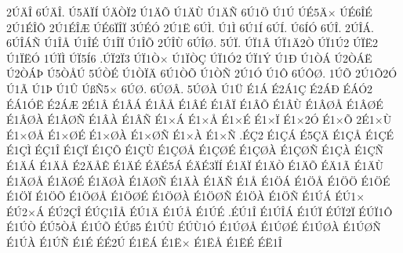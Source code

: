 {2^^da^^c4^^ce
6^^da^^c4^^ce.
^^da5^^c4^^cf^^cd
^^da^^c4^^d2^^cf2
^^da1^^c4^^d5
^^da1^^c4^^d9
^^da1^^c4^^d1
6^^da1^^d6
^^da1^^da
^^da^^c95^^c4^^d7
^^da^^c96^^ce^^c9
2^^da1^^c9^^ce^^d4
2^^da1^^c9^^ce^^c6
^^da^^c96^^cf^^ce^^cf
3^^da^^c9^^d3
2^^da1^^cb
6^^da^^cc.
^^da1^^cc
6^^da1^^cd
6^^da^^cd.
^^da6^^cd^^d3
6^^da^^ce.
2^^da^^ce^^c1.
6^^da^^ce^^c1^^d1
^^da1^^ce^^c5
^^da1^^ce^^c9
^^da1^^ce^^cf
^^da1^^ce^^d5
2^^da^^ce^^d9
6^^da^^ce^^d8.
5^^da^^cf.
^^da^^cf1^^c2
^^da^^cf1^^c42^^d2
^^da^^cf1^^da2
^^da^^cf^^cb2
^^da1^^cf^^cb^^d3
1^^da^^cf^^cc
^^da^^cf5^^cd6
.^^da^^cf2^^cf3
^^da^^cf1^^d2^^d7
^^da1^^cf^^d2^^c7
^^da^^cf1^^d32
^^da^^cf1^^dd
^^da1^^d0
^^da1^^d2^^c1
^^da2^^d2^^c1^^cb
^^da2^^d2^^c1^^de
^^da5^^d2^^c5^^da
5^^da^^d2^^c9
^^da1^^d2^^cf^^c4
6^^da1^^d2^^d5
^^da1^^d2^^d1
2^^da1^^d3
^^da1^^d4
6^^da^^d4^^d8.
1^^da^^d5
2^^da1^^d52^^d3
^^da1^^c3
^^da1^^de
^^da1^^db
^^da^^df^^d15^^d7
6^^da^^d8.
6^^da^^d8^^c2.
5^^da^^d8^^c0
^^da1^^dc
^^c91^^c1
^^c92^^c11^^c7
^^c92^^c1^^d0
^^c9^^c1^^d32
^^c9^^c11^^d3^^cb
^^c92^^c1^^c6
2^^c91^^c2
^^c91^^c2^^c1
^^c91^^c2^^c5
^^c91^^c2^^c9
^^c91^^c2^^cf
^^c91^^c2^^d5
^^c91^^c2^^d9
^^c91^^c2^^d8^^c5
^^c91^^c2^^d8^^c9
^^c91^^c2^^d8^^c0
^^c91^^c2^^d8^^d1
^^c91^^c2^^c0
^^c91^^c2^^d1
^^c91^^d7^^c1
^^c91^^d7^^c5
^^c91^^d7^^c9
^^c91^^d7^^cf
^^c91^^d72^^d3
^^c91^^d7^^d5
2^^c91^^d7^^d9
^^c91^^d7^^d8^^c5
^^c91^^d7^^d8^^c9
^^c91^^d7^^d8^^c0
^^c91^^d7^^d8^^d1
^^c91^^d7^^c0
^^c91^^d7^^d1
.^^c9^^c72
^^c91^^c7^^c1
^^c95^^c7^^c4
^^c91^^c7^^c5
^^c91^^c7^^c9
^^c91^^c7^^cc
^^c9^^c71^^ce
^^c91^^c7^^cf
^^c91^^c7^^d5
^^c91^^c7^^d9
^^c91^^c7^^d8^^c5
^^c91^^c7^^d8^^c9
^^c91^^c7^^d8^^c0
^^c91^^c7^^d8^^d1
^^c91^^c7^^c0
^^c91^^c7^^d1
^^c91^^c4^^c1
^^c91^^c4^^c5
^^c92^^c4^^c5^^ca
^^c91^^c4^^c9
^^c9^^c4^^c95^^c1
^^c9^^c4^^c93^^cf^^cd
^^c91^^c4^^cf
^^c91^^c4^^d2
^^c91^^c4^^d5
^^c9^^c41^^c3
^^c91^^c4^^d9
^^c91^^c4^^d8^^c5
^^c91^^c4^^d8^^c9
^^c91^^c4^^d8^^c0
^^c91^^c4^^d8^^d1
^^c91^^c4^^c0
^^c91^^c4^^d1
^^c91^^c5
^^c91^^d6^^c1
^^c91^^d6^^c5
^^c91^^d6^^d6
^^c91^^d6^^c9
^^c91^^d6^^cf
^^c91^^d6^^d5
^^c91^^d6^^d8^^c5
^^c91^^d6^^d8^^c9
^^c91^^d6^^d8^^c0
^^c91^^d6^^d8^^d1
^^c91^^d6^^c0
^^c91^^d6^^d1
^^c91^^da^^c1
^^c9^^da1^^d7
^^c9^^da2^^d7^^c1
^^c9^^da2^^c7^^ce
^^c9^^da^^c71^^ce^^c5
^^c9^^da1^^c4
^^c91^^da^^c5
^^c91^^da^^c9
.^^c9^^da1^^ce
^^c91^^da^^ce^^c1
^^c91^^da^^cf
^^c9^^da^^cf2^^cf
^^c9^^da^^cf1^^d4
^^c91^^da^^d2
^^c9^^da5^^d2^^c5
^^c91^^da^^d5
^^c9^^da^^df5
^^c91^^da^^d9
^^c9^^da^^d91^^d3
^^c91^^da^^d8^^c5
^^c91^^da^^d8^^c9
^^c91^^da^^d8^^c0
^^c91^^da^^d8^^d1
^^c91^^da^^c0
^^c91^^da^^d1
^^c91^^c9
^^c9^^c92^^da
^^c91^^cb^^c1
^^c91^^cb^^d7
^^c91^^cb^^c5
^^c91^^cb^^c9
^^c9^^cb1^^ce
}
